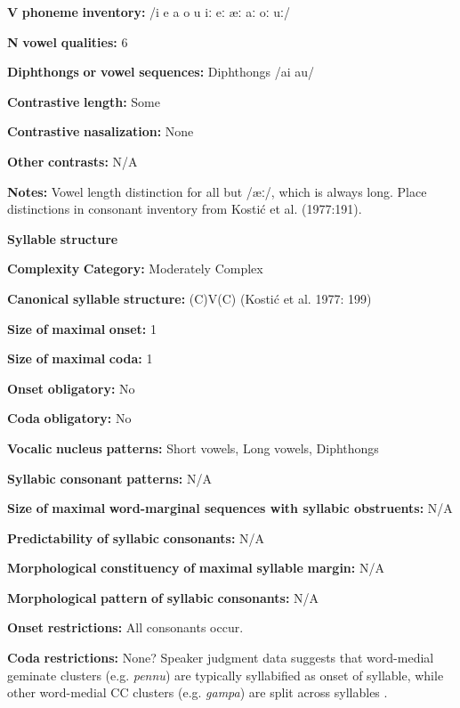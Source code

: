 \begin{styleBody}
\textbf{V} \textbf{phoneme} \textbf{inventory:} /i e a o u iː eː æː aː oː uː/

\textbf{N} \textbf{vowel} \textbf{qualities:} 6

\textbf{Diphthongs} \textbf{or} \textbf{vowel} \textbf{sequences:} Diphthongs /ai au/

\textbf{Contrastive} \textbf{length:} Some

\textbf{Contrastive} \textbf{nasalization:} None

\textbf{Other} \textbf{contrasts:} N/A

\textbf{Notes:} Vowel length distinction for all but /æː/, which is always long. Place distinctions in consonant inventory from Kostić et al. (1977:191).

\textbf{Syllable} \textbf{structure}

\textbf{Complexity} \textbf{Category:} Moderately Complex

\textbf{Canonical} \textbf{syllable} \textbf{structure:} (C)V(C) (Kostić et al. 1977: 199)

\textbf{Size} \textbf{of} \textbf{maximal} \textbf{onset:} 1

\textbf{Size} \textbf{of} \textbf{maximal} \textbf{coda:} 1

\textbf{Onset} \textbf{obligatory:} No

\textbf{Coda} \textbf{obligatory:} No

\textbf{Vocalic} \textbf{nucleus} \textbf{patterns:} Short vowels, Long vowels, Diphthongs

\textbf{Syllabic} \textbf{consonant} \textbf{patterns:} N/A

\textbf{Size} \textbf{of} \textbf{maximal} \textbf{word{}-marginal sequences with syllabic obstruents:} N/A

\textbf{Predictability} \textbf{of} \textbf{syllabic} \textbf{consonants:} N/A

\textbf{Morphological} \textbf{constituency} \textbf{of} \textbf{maximal} \textbf{syllable} \textbf{margin:} N/A

\textbf{Morphological} \textbf{pattern} \textbf{of} \textbf{syllabic} \textbf{consonants:} N/A

\textbf{Onset} \textbf{restrictions:} All consonants occur. 

\textbf{Coda} \textbf{restrictions:} None? Speaker judgment data suggests that word-medial geminate clusters (e.g. \textit{pennu}) are typically syllabified as onset of syllable, while other word-medial CC clusters (e.g. \textit{gampa}) are split across syllables \citep{Sailaja1999}.


\end{styleBody}
